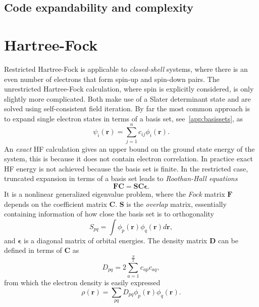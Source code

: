 \documentclass[final,3p,times,twocolumn]{elsarticle}
\begin{document}
	\subsection{Code expandability and complexity}
		
	
	
	
	
	\appendix
	\section{Hartree-Fock}
	\label{app:HF}
	Restricted Hartree-Fock is applicable to \emph{closed-shell} systems, where there is an even number of electrons that form spin-up and spin-down pairs. The unrestricted Hartree-Fock calculation, where spin is explicitly considered, is only slightly more complicated. Both make use of a Slater determinant state and are solved using self-consistent field iteration. By far the most common approach is to expand single electron states in terms of a basis set, see~\ref{app:basissets}, as
	\begin{equation}
		\psi_{i}(\mathbf{r})=\sum_{j=1}^{n} c_{i j} \phi_{i}(\mathbf{r}).
	\end{equation}
	An \emph{exact} HF calculation gives an upper bound on the ground state energy of the system, this is because it does not contain electron correlation. In practice exact HF energy is not achieved because the basis set is finite. In the restricted case, truncated expansion in terms of a basis set leads to \emph{Roothan-Hall equations}
	\begin{equation}
		\mathbf{F}\mathbf{C} = \mathbf{S}\mathbf{C}\mathbf{\epsilon}.
	\end{equation}
	It is a nonlinear generalized eigenvalue problem, where the \emph{Fock} matrix $\mathbf{F}$ depends on the coefficient matrix $\mathbf{C}$. $\mathbf{S}$ is the \emph{overlap} matrix, essentially containing information of how close the basis set is to orthogonality
	\begin{equation}
		S_{p q}=\int \phi_{p}(\mathbf{r}) \phi_{q}(\mathbf{r}) d \mathbf{r},
	\end{equation}
	and $\mathbf{\epsilon}$ is a diagonal matrix of orbital energies. The density matrix $\mathbf{D}$ can be defined in terms of $\mathbf{C}$ as
	\begin{equation}
		D_{p q}=2 \sum_{a=1}^{\frac{N}{2}} c_{a p} c_{a q},
	\end{equation}
	from which the electron density is easily expressed
	\begin{equation}
		\rho(\mathbf{r})=\sum_{p q} D_{p q} \phi_{p}(\mathbf{r}) \phi_{q}(\mathbf{r}).
	\end{equation}
\end{document}
